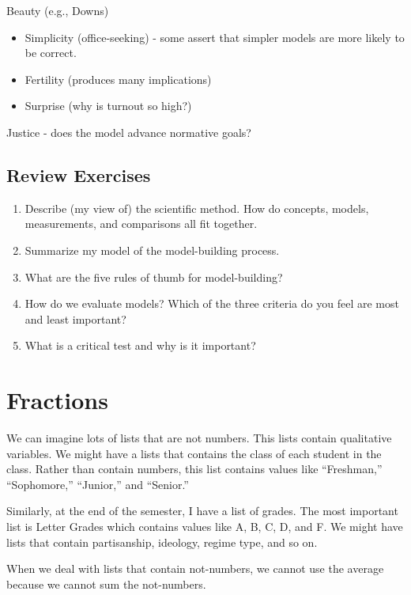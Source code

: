 \documentclass[]{book}
\providecommand{\tightlist}{%
  \setlength{\itemsep}{0pt}\setlength{\parskip}{0pt}}
\theoremstyle{definition}
\theoremstyle{definition}
\theoremstyle{definition}
\theoremstyle{remark}
\begin{document}
Beauty (e.g., Downs)

\begin{itemize}
\tightlist
\item
  Simplicity (office-seeking) - some assert that simpler models are more
  likely to be correct.
\item
  Fertility (produces many implications)
\item
  Surprise (why is turnout so high?)
\end{itemize}

Justice - does the model advance normative goals?

\section{Review Exercises}\label{review-exercises}

\begin{enumerate}
\def\labelenumi{\arabic{enumi}.}
\tightlist
\item
  Describe (my view of) the scientific method. How do concepts, models,
  measurements, and comparisons all fit together.
\item
  Summarize my model of the model-building process.
\item
  What are the five rules of thumb for model-building?
\item
  How do we evaluate models? Which of the three criteria do you feel are
  most and least important?
\item
  What is a critical test and why is it important?
\end{enumerate}

\chapter{Fractions}\label{fractions}

We can imagine lots of lists that are not numbers. This lists contain
qualitative variables. We might have a lists that contains the class of
each student in the class. Rather than contain numbers, this list
contains values like ``Freshman,'' ``Sophomore,'' ``Junior,'' and
``Senior.''

Similarly, at the end of the semester, I have a list of grades. The most
important list is Letter Grades which contains values like A, B, C, D,
and F. We might have lists that contain partisanship, ideology, regime
type, and so on.

When we deal with lists that contain not-numbers, we cannot use the
average because we cannot sum the not-numbers.
\end{document}

